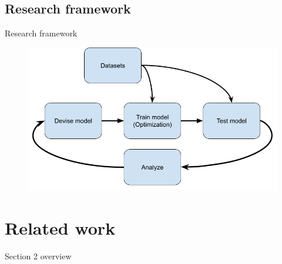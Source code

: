 \documentclass{beamer}
\begin{document}
\subsection{Research framework}
\begin{frame}{Research framework}
    \begin{figure}
        \centering
        \includegraphics[scale=0.4]{img/slide/research_framework.png}
        \label{fig:framework_diagram}
    \end{figure}
\end{frame}


\section{Related work}
\begin{frame}{Section 2 overview}
    \tableofcontents[sections={2}]
\end{frame}
\end{document}
